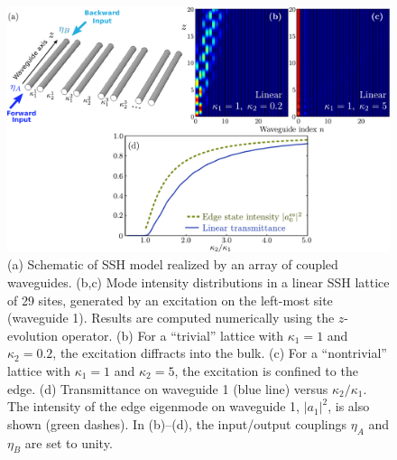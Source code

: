 \documentclass[aps,prx,twocolumn,superscriptaddress]{revtex4-1}
\newcommand{\figfullwidth}{16cm}
\begin{document}
\begin{figure}
  \centering
  \includegraphics[width=\figfullwidth]{TB/ssh.pdf}
  \caption{(a) Schematic of SSH model realized by an array of coupled waveguides.  (b,c) Mode intensity distributions in a linear SSH lattice of 29 sites, generated by an excitation on the left-most site (waveguide 1).  Results are computed numerically using the $z$-evolution operator.  (b) For a ``trivial'' lattice with $\kappa_1 = 1$ and $\kappa_2 = 0.2$, the excitation diffracts into the bulk.  (c) For a ``nontrivial'' lattice with $\kappa_1 = 1$ and $\kappa_2 = 5$, the excitation is confined to the edge.  (d) Transmittance on waveguide 1 (blue line) versus $\kappa_2/\kappa_1$.  The intensity of the edge eigenmode on waveguide 1, $|a_1|^2$, is also shown (green dashes).  In (b)--(d), the input/output couplings $\eta_A$ and $\eta_B$ are set to unity.}
\label{fig:ssh}
\end{figure}
\end{document}
